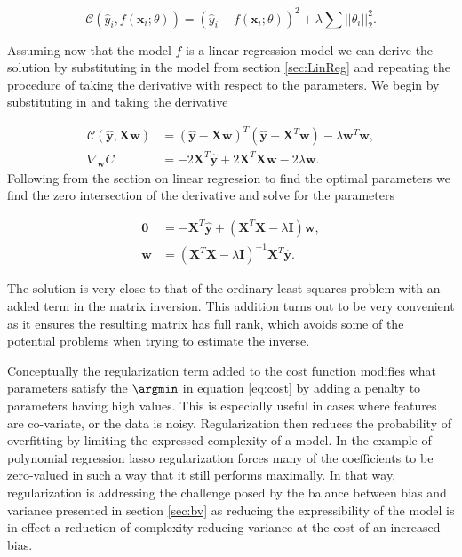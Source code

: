 \begin{equation}\label{eq:mse_ridge}
\mathcal{C}(\hat{y}_i, f(\mathbf{x}_i; \theta)) = (\hat{y}_i - f(\mathbf{x}_i; \theta))^2 + \lambda\sum||\theta_i||^2_2.
\end{equation}

\noindent Assuming now that the model $f$ is a linear regression model we can derive the solution by substituting in the model from section \ref{sec:LinReg} and repeating the procedure of taking the derivative with respect to the parameters. We begin by substituting in and taking the derivative 

\begin{align}
\mathcal{C}(\mathbf{\hat{y}}, \mathbf{Xw}) &= ( \mathbf{\hat{y}} - \mathbf{Xw})^T( \mathbf{\hat{y}} - \mathbf{X}^T\mathbf{w}) - \lambda \mathbf{w}^T\mathbf{w}, \\
\nabla_\mathbf{w} C &= -2\mathbf{X}^T\mathbf{\hat{y}} + 2\mathbf{X}^T\mathbf{Xw} - 2\lambda\mathbf{w}. 
\end{align}
\noindent Following from the section on linear regression to find the optimal parameters we find the zero intersection of the derivative and solve for the parameters 

\begin{align}
\mathbf{0} &=  -\mathbf{X}^T\mathbf{\hat{y}} + (\mathbf{X}^T\mathbf{X} - \lambda \mathbf{I})\mathbf{w}, \\
\mathbf{w} &= (\mathbf{X}^T\mathbf{X} - \lambda \mathbf{I})^{-1}\mathbf{X}^T\mathbf{\hat{y}}.
\end{align}

\noindent The solution is very close to that of the ordinary least squares problem with an added term in the matrix inversion. This addition turns out to be very convenient as it ensures the resulting matrix has full rank, which avoids some of the potential problems when trying to estimate the inverse. 

Conceptually the regularization term added to the cost function modifies what parameters satisfy the $\argmin$ in equation \ref{eq:cost} by adding a penalty to parameters having high values. This is especially useful in cases where features are co-variate, or the data is noisy. 
Regularization then reduces the probability of overfitting by limiting the expressed complexity of a model. In the example of polynomial regression lasso regularization forces many of the coefficients to be zero-valued in such a way that it still performs maximally. In that way, regularization is addressing the challenge posed by the balance between bias and variance presented in section \ref{sec:bv} as reducing the expressibility of the model is in effect a reduction of complexity reducing variance at the cost of an increased bias.
